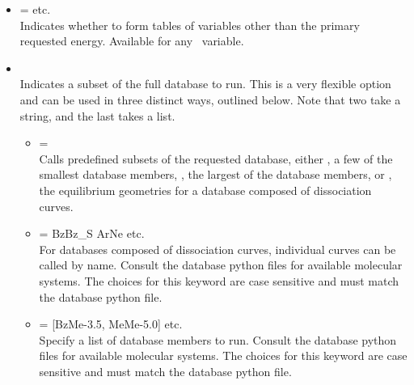 \begin{itemize}
\item {} = \textit{\pyoptionval{[]}} \textbar\; {} \textbar\; etc. \\
Indicates whether to form tables of variables other than the primary requested energy. 
Available for any \PSI\ variable.

\item {} \\
Indicates a subset of the full database to run. This is a very flexible option and can be used in
three distinct ways, outlined below. Note that two take a string, and the last takes a list.
\begin{itemize}
\item {} =  \textbar\;  \textbar\;  \\
Calls predefined subsets of the requested database, either , a few
of the smallest database members, , the largest of the database members,
or , the equilibrium geometries for a database composed of
dissociation curves.
\item {} = \textsf{\qq BzBz\_S\qq} \textbar\; \textsf{\qq ArNe\qq} \textbar\; etc. \\
For databases composed of dissociation curves, individual curves can be called by name.
Consult the database python files for available molecular systems. The choices for this keyword
are case sensitive and must match the database python file.
\item {} = \pyoptionval{[1,2,5]} \textbar\; \pyoptionval{[\qq 1\qq, \qq 2\qq, \qq 5\qq]} \textbar\; \textsf{[\qq BzMe-3.5\qq, \qq MeMe-5.0\qq]} \textbar\; etc. \\
Specify a list of database members to run. Consult the database python files for available
molecular systems. The choices for this keyword are case sensitive and must match the database
python file.
\end{itemize}
\end{itemize}


